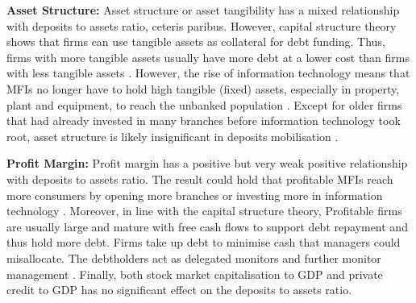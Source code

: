 \documentclass[a4paper,nobind]{templates/ociamthesis}
\begin{document}
\textbf{Asset Structure:} Asset structure or asset tangibility has a mixed relationship with deposits to assets ratio, ceteris paribus. However, capital structure theory shows that firms can use tangible assets as collateral for debt funding. Thus, firms with more tangible assets usually have more debt at a lower cost than firms with less tangible assets \autocite{campello2011capital,ombati2016effects}. However, the rise of information technology means that MFIs no longer have to hold high tangible (fixed) assets, especially in property, plant and equipment, to reach the unbanked population \autocite{asadullah2021access}. Except for older firms that had already invested in many branches before information technology took root, asset structure is likely insignificant in deposits mobilisation \autocite{di2021technology}.

\textbf{Profit Margin:} Profit margin has a positive but very weak positive relationship with deposits to assets ratio. The result could hold that profitable MFIs reach more consumers by opening more branches or investing more in information technology \autocite{di2021technology}. Moreover, in line with the capital structure theory, Profitable firms are usually large and mature with free cash flows to support debt repayment and thus hold more debt. Firms take up debt to minimise cash that managers could misallocate. The debtholders act as delegated monitors and further monitor management \autocite{barclay2005capital,gwatidzo2009corporate,ombati2016effects}. Finally, both stock market capitalisation to GDP and private credit to GDP has no significant effect on the deposits to assets ratio.
\end{document}

